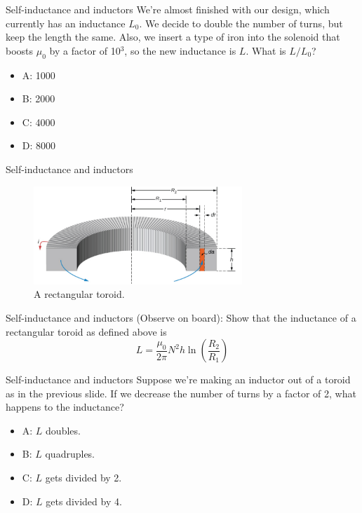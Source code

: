 \documentclass{beamer}
\begin{document}
\begin{frame}{Self-inductance and inductors}
We're almost finished with our design, which currently has an inductance $L_0$.  We decide to double the number of turns, but keep the length the same.  Also, we insert a type of iron into the solenoid that boosts $\mu_0$ by a factor of 10$^3$, so the new inductance is $L$.  What is $L/L_0$?
\begin{itemize}
\item A: 1000
\item B: 2000
\item C: 4000
\item D: 8000
\end{itemize}
\end{frame}

\begin{frame}{Self-inductance and inductors}
\begin{figure}
\centering
\includegraphics[width=0.7\textwidth]{figures/ind5.png}
\caption{\label{fig:ind5} A rectangular toroid.}
\end{figure}
\end{frame}

\begin{frame}{Self-inductance and inductors}
(Observe on board): Show that the inductance of a rectangular toroid as defined above is
\begin{equation}
L = \frac{\mu_0}{2\pi}N^2 h \ln\left(\frac{R_2}{R_1}\right)
\end{equation}
\end{frame}

\begin{frame}{Self-inductance and inductors}
Suppose we're making an inductor out of a toroid as in the previous slide.  If we decrease the number of turns by a factor of 2, what happens to the inductance?
\begin{itemize}
\item A: $L$ doubles.
\item B: $L$ quadruples.
\item C: $L$ gets divided by 2.
\item D: $L$ gets divided by 4.
\end{itemize}
\end{frame}
\end{document}

